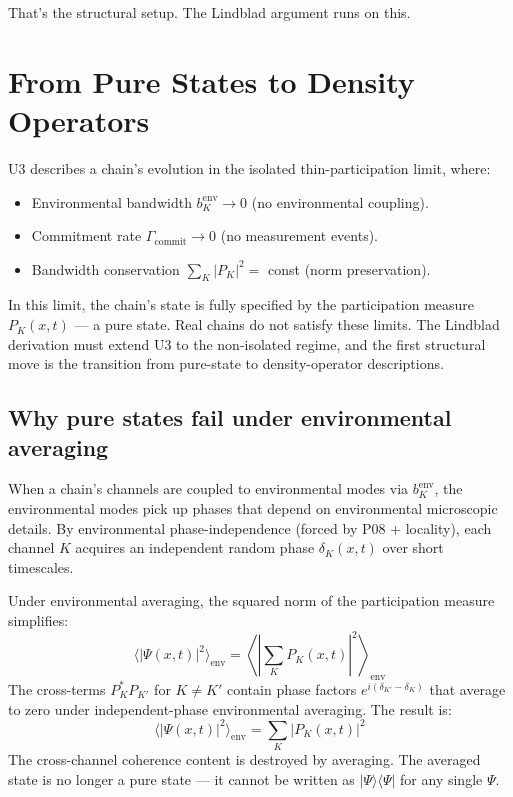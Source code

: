 \documentclass[11pt,a4paper]{article}
\begin{document}
That's the structural setup. The Lindblad argument runs on this.

\section{From Pure States to Density Operators}

U3 describes a chain's evolution in the isolated thin-participation limit, where:
\begin{itemize}[noitemsep]
  \item Environmental bandwidth $b_K^{\mathrm{env}} \to 0$ (no environmental coupling).
  \item Commitment rate $\Gamma_{\mathrm{commit}} \to 0$ (no measurement events).
  \item Bandwidth conservation $\sum_K |P_K|^2 = $ const (norm preservation).
\end{itemize}

In this limit, the chain's state is fully specified by the participation measure $P_K(x, t)$ --- a pure state. Real chains do not satisfy these limits. The Lindblad derivation must extend U3 to the non-isolated regime, and the first structural move is the transition from pure-state to density-operator descriptions.

\subsection{Why pure states fail under environmental averaging}

When a chain's channels are coupled to environmental modes via $b_K^{\mathrm{env}}$, the environmental modes pick up phases that depend on environmental microscopic details. By environmental phase-independence (forced by P08 + locality), each channel $K$ acquires an independent random phase $\delta_K(x, t)$ over short timescales.

Under environmental averaging, the squared norm of the participation measure simplifies:
\[
\langle|\Psi(x, t)|^{2}\rangle_{\mathrm{env}} = \left\langle\left|\sum_K P_K(x, t)\right|^{2}\right\rangle_{\mathrm{env}}
\]
The cross-terms $P_K^* P_{K'}$ for $K \neq K'$ contain phase factors $e^{i(\delta_{K'} - \delta_K)}$ that average to zero under independent-phase environmental averaging. The result is:
\[
\langle|\Psi(x, t)|^{2}\rangle_{\mathrm{env}} = \sum_K |P_K(x, t)|^{2}
\]
The cross-channel coherence content is destroyed by averaging. The averaged state is no longer a pure state --- it cannot be written as $|\Psi\rangle\langle\Psi|$ for any single $\Psi$.
\end{document}
